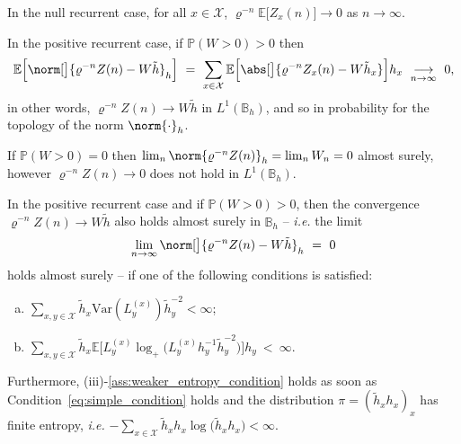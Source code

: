 \begin{refsegment}
\begin{thm}\label{thm:type_convergence}\hfill
  \begin{mathlist}
    \item In the null recurrent case, for all $x\in \mathcal{X}$,  $\varrho^{-n}\mathbb{E}\big[Z_x(n)\big]\to 0$ as $n\to\infty$.
    \item In the positive recurrent case, if $\mathbb{P}(W>0)>0$ then
    \begin{equation*}
      \mathbb{E}\Big[\norm[\big]{\varrho^{-n} Z(n) - W\tilde{h}}_h\Big]\ =\ \sum_{x\in \mathcal{X}} \mathbb{E}\Big[\abs[\big]{\varrho^{-n}Z_x(n) - W\tilde{h}_x} \Big] h_x\ \underset{n\to\infty}{\longrightarrow} \ 0,
    \end{equation*}
    in other words, $\varrho^{-n}Z(n)\to  W\tilde{h}$ in $L^1(\mathbb{B}_h)$, and so in probability for the topology of the norm $\norm{\cdot}_h$.

If $\mathbb{P}(W>0)=0$ then $\lim_{n}\norm{\varrho^{-n}Z(n)}_h = \lim_n W_n = 0$ almost surely,  however $\varrho^{-n}Z(n)\to 0$ does not hold in $L^1(\mathbb{B}_h)$.
    \item In the positive recurrent case and if  $\mathbb{P}(W>0)>0$, then the convergence $\varrho^{-n}Z(n)\to  W\tilde{h}$ also holds almost surely in $\mathbb{B}_h$ -- \textit{i.e.} the limit
    \begin{equation}\label{eq:type-CV-as}
     \lim_{n\to\infty} \norm[\big]{\varrho^{-n} Z(n) - W\tilde{h}}_h \ =\ 0
    \end{equation}
    holds almost surely -- if one of the following conditions is satisfied:
    \begin{enumerate}[(a)]
      \item  $\displaystyle\sum_{x,y\in \mathcal{X}} \tilde{h}_x\mathrm{Var}(L^{(x)}_y)\tilde{h}_y^{-2} < \infty$; \label{ass:variance_condition}
      \item $\displaystyle \sum_{x,y\in \mathcal{X}} \tilde{h}_x \mathbb{E}\Big[L^{(x)}_y\log_+\big( L^{(x)}_y h_y^{-1}\tilde{h}_y^{-2} \big) \Big] h_y\ <\ \infty$.
      \label{ass:weaker_entropy_condition}
    \end{enumerate}
    Furthermore, (iii)-\ref{ass:weaker_entropy_condition} holds as soon as Condition~\eqref{eq:simple_condition} holds and the distribution $\pi= (\tilde{h}_x h_x)_x$ has finite entropy, \textit{i.e.} $-\sum_{x\in \mathcal{X}} \tilde{h}_xh_x \log\big( \tilde{h}_xh_x\big)
    <\infty$.
  \end{mathlist}
\end{thm}


\end{refsegment}
